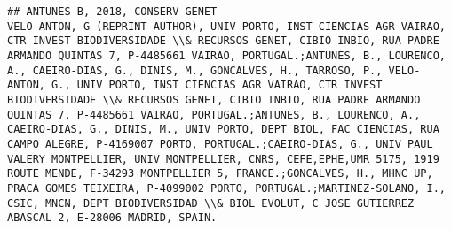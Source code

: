 \documentclass[]{article}
\begin{document}
\begin{verbatim}
## ANTUNES B, 2018, CONSERV GENET                                                                                                                                                                                                                                                                                                                                                                                                                                                                                                                              VELO-ANTON, G (REPRINT AUTHOR), UNIV PORTO, INST CIENCIAS AGR VAIRAO, CTR INVEST BIODIVERSIDADE \\& RECURSOS GENET, CIBIO INBIO, RUA PADRE ARMANDO QUINTAS 7, P-4485661 VAIRAO, PORTUGAL.;ANTUNES, B., LOURENCO, A., CAEIRO-DIAS, G., DINIS, M., GONCALVES, H., TARROSO, P., VELO-ANTON, G., UNIV PORTO, INST CIENCIAS AGR VAIRAO, CTR INVEST BIODIVERSIDADE \\& RECURSOS GENET, CIBIO INBIO, RUA PADRE ARMANDO QUINTAS 7, P-4485661 VAIRAO, PORTUGAL.;ANTUNES, B., LOURENCO, A., CAEIRO-DIAS, G., DINIS, M., UNIV PORTO, DEPT BIOL, FAC CIENCIAS, RUA CAMPO ALEGRE, P-4169007 PORTO, PORTUGAL.;CAEIRO-DIAS, G., UNIV PAUL VALERY MONTPELLIER, UNIV MONTPELLIER, CNRS, CEFE,EPHE,UMR 5175, 1919 ROUTE MENDE, F-34293 MONTPELLIER 5, FRANCE.;GONCALVES, H., MHNC UP, PRACA GOMES TEIXEIRA, P-4099002 PORTO, PORTUGAL.;MARTINEZ-SOLANO, I., CSIC, MNCN, DEPT BIODIVERSIDAD \\& BIOL EVOLUT, C JOSE GUTIERREZ ABASCAL 2, E-28006 MADRID, SPAIN.

\end{verbatim}
\end{document}
